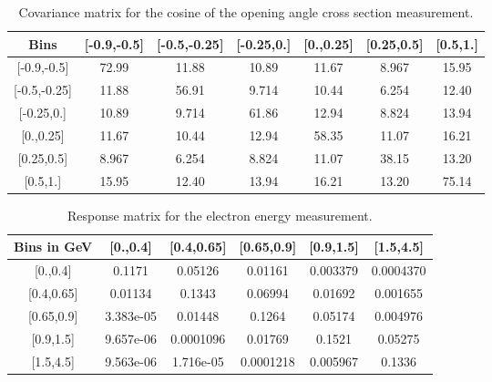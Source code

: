 \documentclass[amsmath,amssymb,aps,prd,showpacs,twocolumn,superscriptaddress,letterpaper,longbibliography, floatfix]{revtex4-2}
\begin{document}
\FloatBarrier
\begin{table}[H]
\caption{Covariance matrix for the cosine of the opening angle cross section measurement.} \label{tbl:CovepA}
\begin{center} \begin{tabular}{|c|c|c|c|c|c|c|}
\hline
Bins & [-0.9,-0.5] & [-0.5,-0.25]& [-0.25,0.]& [0.,0.25]& [0.25,0.5]& [0.5,1.]\\\hline
{[-0.9,-0.5]} &  72.99& 11.88& 10.89& 11.67& 8.967& 15.95 \\
{[-0.5,-0.25]}  &11.88& 56.91& 9.714& 10.44& 6.254& 12.40  \\
{[-0.25,0.]}  &10.89& 9.714& 61.86& 12.94& 8.824& 13.94  \\
{[0.,0.25]}  &11.67& 10.44& 12.94& 58.35& 11.07& 16.21  \\
{[0.25,0.5]}  &8.967& 6.254& 8.824& 11.07& 38.15& 13.20  \\
{[0.5,1.]}  &15.95& 12.40& 13.94& 16.21& 13.20& 75.14 \\
\hline
\end{tabular} \end{center}
\end{table}
\FloatBarrier
\begin{table}[H]
\caption{Response matrix for the electron energy measurement.}
\label{tbl:RepEe}
\begin{center} \begin{tabular}{|c|c|c|c|c|c|}
\hline
Bins in GeV & [0.,0.4] & [0.4,0.65]& [0.65,0.9]& [0.9,1.5]& [1.5,4.5]\\\hline
{[0.,0.4]} &  0.1171& 0.05126& 0.01161& 0.003379& 0.0004370  	\\
{[0.4,0.65]}  &0.01134& 0.1343& 0.06994& 0.01692& 0.001655  \\
{[0.65,0.9]}  &3.383e-05& 0.01448& 0.1264& 0.05174& 0.004976   \\
{[0.9,1.5]}  &9.657e-06& 0.0001096& 0.01769& 0.1521& 0.05275   \\
{[1.5,4.5]}  & 9.563e-06& 1.716e-05& 0.0001218& 0.005967& 0.1336 \\
\hline
\end{tabular} \end{center}
\end{table}
\FloatBarrier
\end{document}
